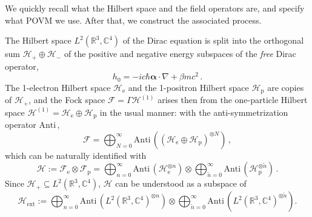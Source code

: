 \documentclass[12pt]{article}
\newcommand{\CCC}{\mathbb{C}} %
\newcommand{\RRR}{\mathbb{R}} %
\newcommand{\I}{i} %
\newcommand{\1}{\mathbf{1}} %
\newcommand{\Anti}{{\mathrm{Anti}\,}} %
\newcommand{\Hilbert}{\mathscr{H}}
\newcommand{\Fock}{\mathscr{F}} %
\newcommand{\valpha}{{\boldsymbol \alpha}}
\newcommand{\pn}{{\widetilde{n}}}
\newcommand{\el}{\mathrm{e}} %
\newcommand{\pos}{\mathrm{p}} %
\newcommand{\ext}{{\mathrm{ext}}} %
\begin{document}
We quickly recall what the Hilbert space and the field operators are,
and specify what POVM we use.  After that, we construct the associated
process.

The Hilbert space $L^2(\RRR^3,\CCC^4)$ of the Dirac equation is split
into the orthogonal sum $\Hilbert_+ \oplus \Hilbert_-$ of the positive
and negative energy subspaces of the \emph{free} Dirac operator,
\[
   h_0= -\I c\hbar \valpha \cdot \nabla + \beta mc^2\,.
\]
The 1-electron Hilbert space $\Hilbert_\el$ and the 1-positron Hilbert
space $\Hilbert_\pos$ are copies of $\Hilbert_+$, and the Fock space
$\Fock=\Gamma \Hilbert^{(1)}$ arises then from the one-particle
Hilbert space $\Hilbert^{(1)} = \Hilbert_\el \oplus \Hilbert_\pos$ in
the usual manner: with the anti-symmetrization operator $\Anti$,
\begin{equation}\label{elplusposFock}
   \Fock= \bigoplus_{N=0}^\infty \Anti
   (({\Hilbert_\el}\oplus{\Hilbert_\pos})^{\otimes N})\,,
\end{equation}
which can be naturally identified with
\begin{equation}\label{elFockposFock}
   \Hilbert := \Fock_\el \otimes \Fock_\pos =
   \bigoplus_{n=0}^\infty \Anti (\Hilbert_\el^{\otimes n}) \otimes
   \bigoplus_{\pn=0}^\infty \Anti (\Hilbert_\pos^{\otimes \pn})\,.
\end{equation}
Since $\Hilbert_+ \subseteq L^2(\RRR^3,\CCC^4)$, $\Hilbert$ can be
understood as a subspace of
\begin{equation}\label{elHext}
   \Hilbert_\ext := \bigoplus_{n=0}^\infty
   \Anti(L^2(\RRR^3,\CCC^4)^{\otimes n}) \otimes
   \bigoplus_{\pn=0}^\infty \Anti(L^2(\RRR^3,\CCC^4)^{\otimes \pn}) .
\end{equation}
\end{document}
